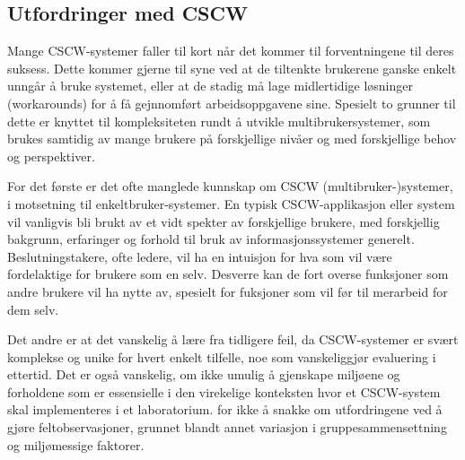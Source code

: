 \subsection{Utfordringer med CSCW}
\label{chp: utfordringerMedCSCW}

Mange CSCW-systemer faller til kort når det kommer til forventningene til deres suksess. Dette kommer gjerne til syne ved at de tiltenkte brukerene ganske enkelt unngår å bruke systemet, eller at de stadig må lage midlertidige løsninger (workarounds) for å få gejnnomført arbeidsoppgavene sine. Spesielt to grunner til dette er knyttet til kompleksiteten rundt å utvikle multibrukersystemer, som brukes samtidig av mange brukere på forskjellige nivåer og med forskjellige behov og perspektiver.

\noindent
For det første er det ofte manglede kunnskap om CSCW (multibruker-)systemer, i motsetning til enkeltbruker-systemer. En typisk CSCW-applikasjon eller system vil vanligvis bli brukt av et vidt spekter av forskjellige brukere, med forskjellig bakgrunn, erfaringer og forhold til bruk av informasjonssystemer generelt. Beslutningstakere, ofte ledere, vil ha en intuisjon for hva som vil være fordelaktige for brukere som en selv. Desverre kan de fort overse funksjoner som andre brukere vil ha nytte av, spesielt for fuksjoner som vil før til merarbeid for dem selv. 

\noindent
Det andre er at det vanskelig å lære fra tidligere feil, da CSCW-systemer er svært komplekse og unike for hvert enkelt tilfelle, noe som vanskeliggjør evaluering i ettertid. Det er også vanskelig, om ikke umulig å gjenskape miljøene og forholdene som er essensielle i den virekelige konteksten hvor et CSCW-system skal implementeres i et laboratorium. for ikke å snakke om utfordringene ved å gjøre feltobservasjoner, grunnet blandt annet variasjon i gruppesammensettning og miljømessige faktorer.

